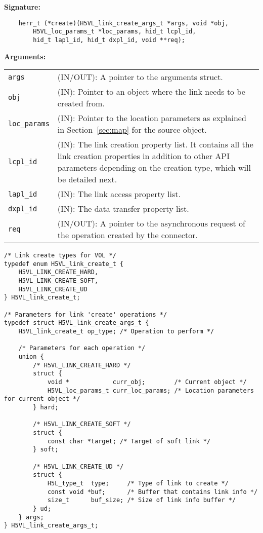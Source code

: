 \begin{mdframed}[style=bgbox]
\textbf{Signature:}
\begin{lstlisting}
    herr_t (*create)(H5VL_link_create_args_t *args, void *obj,
        H5VL_loc_params_t *loc_params, hid_t lcpl_id, 
        hid_t lapl_id, hid_t dxpl_id, void **req);
\end{lstlisting}

\textbf{Arguments:}\\
\begin{tabular}{l p{13.5cm}}
  \texttt{args} & (IN/OUT): A pointer to the arguments struct.\\
  \texttt{obj} & (IN): Pointer to an object where the link needs to be
  created from.\\
  \texttt{loc\_params} & (IN): Pointer to the location parameters as explained in
  Section~\ref{sec:map} for the source object. \\
  \texttt{lcpl\_id} & (IN): The link creation property list. It contains
  all the link creation properties in addition to other API parameters
  depending on the creation type, which will be detailed next.\\
  \texttt{lapl\_id} & (IN): The link access property list.\\
  \texttt{dxpl\_id} & (IN): The data transfer property list.\\
  \texttt{req} & (IN/OUT): A pointer to the asynchronous request of the
  operation created by the connector.\\
\end{tabular}
\end{mdframed}

\begin{lstlisting}
/* Link create types for VOL */
typedef enum H5VL_link_create_t {
    H5VL_LINK_CREATE_HARD,
    H5VL_LINK_CREATE_SOFT,
    H5VL_LINK_CREATE_UD
} H5VL_link_create_t;

/* Parameters for link 'create' operations */
typedef struct H5VL_link_create_args_t {
    H5VL_link_create_t op_type; /* Operation to perform */

    /* Parameters for each operation */
    union {
        /* H5VL_LINK_CREATE_HARD */
        struct {
            void *            curr_obj;        /* Current object */
            H5VL_loc_params_t curr_loc_params; /* Location parameters for current object */
        } hard;

        /* H5VL_LINK_CREATE_SOFT */
        struct {
            const char *target; /* Target of soft link */
        } soft;

        /* H5VL_LINK_CREATE_UD */
        struct {
            H5L_type_t  type;     /* Type of link to create */
            const void *buf;      /* Buffer that contains link info */
            size_t      buf_size; /* Size of link info buffer */
        } ud;
    } args;
} H5VL_link_create_args_t;

\end{lstlisting}

